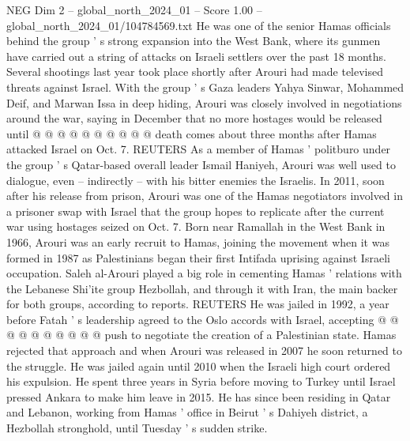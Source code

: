 \begin{textsample}{NEG Dim 2 – global\_north\_2024\_01 – Score 1.00 – global\_north\_2024\_01/104784569.txt}
He was one of the senior Hamas officials behind the group ' s strong expansion into the West Bank, where its gunmen have carried out a string of attacks on Israeli settlers over the past 18 months.
Several shootings last year took place shortly after Arouri had made televised threats against Israel.
With the group ' s Gaza leaders Yahya Sinwar, Mohammed Deif, and Marwan Issa in deep hiding, Arouri was closely involved in negotiations around the war, saying in December that no more hostages would be released until @ @ @ @ @ @ @ @ @ @ death comes about three months after Hamas attacked Israel on Oct. 7.
REUTERS As a member of Hamas ' politburo under the group ' s Qatar-based overall leader Ismail Haniyeh, Arouri was well used to dialogue, even -- indirectly -- with his bitter enemies the Israelis.
In 2011, soon after his release from prison, Arouri was one of the Hamas negotiators involved in a prisoner swap with Israel that the group hopes to replicate after the current war using hostages seized on Oct. 7.
Born near Ramallah in the West Bank in 1966, Arouri was an early recruit to Hamas, joining the movement when it was formed in 1987 as Palestinians began their first Intifada uprising against Israeli occupation.
Saleh al-Arouri played a big role in cementing Hamas ' relations with the Lebanese Shi'ite group Hezbollah, and through it with Iran, the main backer for both groups, according to reports.
REUTERS He was jailed in 1992, a year before Fatah ' s leadership agreed to the Oslo accords with Israel, accepting @ @ @ @ @ @ @ @ @ @ push to negotiate the creation of a Palestinian state.
Hamas rejected that approach and when Arouri was released in 2007 he soon returned to the struggle.
He was jailed again until 2010 when the Israeli high court ordered his expulsion.
He spent three years in Syria before moving to Turkey until Israel pressed Ankara to make him leave in 2015.
He has since been residing in Qatar and Lebanon, working from Hamas ' office in Beirut ' s Dahiyeh district, a Hezbollah stronghold, until Tuesday ' s sudden strike.

\end{textsample}
